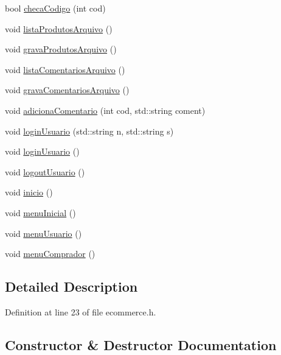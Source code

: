 \begin{DoxyCompactItemize}
bool \hyperlink{class_ecommerce_aec1f281b4fca31a69117ddc5524c5579}{checa\+Codigo} (int cod)
\item 
void \hyperlink{class_ecommerce_a82389edab259d453650aaf497ea4a45c}{lista\+Produtos\+Arquivo} ()
\item 
void \hyperlink{class_ecommerce_a8fe170fb0d8cefcbdb82d7ac0e457927}{grava\+Produtos\+Arquivo} ()
\item 
void \hyperlink{class_ecommerce_a58be27754c9d87aab236f6cda0f2d7b0}{lista\+Comentarios\+Arquivo} ()
\item 
void \hyperlink{class_ecommerce_aa125d7cab07fec0048b3674f507f60de}{grava\+Comentarios\+Arquivo} ()
\item 
void \hyperlink{class_ecommerce_a02ae0b7c3a6f79748410137ba513fee9}{adiciona\+Comentario} (int cod, std\+::string coment)
\item 
void \hyperlink{class_ecommerce_aefbb7d614ba1bcf82d6f8f5730bf2ec8}{login\+Usuario} (std\+::string n, std\+::string s)
\item 
void \hyperlink{class_ecommerce_ab7cf97a9ca7f41ec5c0dbe37ae33abcc}{login\+Usuario} ()
\item 
void \hyperlink{class_ecommerce_a6a4d70321c0b16666bec31b6dfb6caeb}{logout\+Usuario} ()
\item 
void \hyperlink{class_ecommerce_aedc0f3fc9ad6ca9ed9593d4b1e911ade}{inicio} ()
\item 
void \hyperlink{class_ecommerce_a2e20e2e3321c1070e9bac0b31c3b69a6}{menu\+Inicial} ()
\item 
void \hyperlink{class_ecommerce_a3a26138c4418072b5b11995201a4abe1}{menu\+Usuario} ()
\item 
void \hyperlink{class_ecommerce_a798cb006db4cf4562b0306f78f2c625b}{menu\+Comprador} ()
\end{DoxyCompactItemize}


\subsection{Detailed Description}


Definition at line 23 of file ecommerce.\+h.



\subsection{Constructor \& Destructor Documentation}
\mbox{\label{class_ecommerce_a3a1e67dca201bf8b5729799c521e67da}} 

